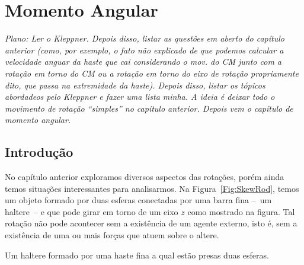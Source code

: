 \chapter{Momento Angular}
\label{Chap:MomentoAngular}

\begin{fullwidth}
{\it
Plano: Ler o Kleppner. Depois disso, listar as questôes em aberto do capítulo anterior (como, por exemplo, o fato não explicado de que podemos calcular a velocidade anguar da haste que cai considerando o mov. do CM junto com a rotação em torno do CM ou a rotação em torno do eixo de rotação propriamente dito, que passa na extremidade da haste). Depois disso, listar os tópicos abordadeos pelo Kleppner e fazer uma lista minha. A ideia é deixar todo o movimento de rotação ``simples'' no capítulo anterior. Depois vem o capítulo de momento angular.
}
\end{fullwidth}

\section{Introdução}

No capítulo anterior exploramos diversos aspectos das rotações, porém ainda temos situações interessantes para analisarmos. Na Figura~\ref{Fig:SkewRod}, temos um objeto formado por duas esferas conectadas por uma barra fina --~um haltere~-- e que pode girar em torno de um eixo $z$ como mostrado na figura. Tal rotação não pode acontecer sem a existência de um agente externo, isto é, sem a existência de uma ou mais forças que atuem sobre o altere.

\begin{marginfigure}
\centering
{}
\caption{Um haltere formado por uma haste fina a qual estão presas duas esferas. \label{Fig:SkewRod}}
\end{marginfigure}

